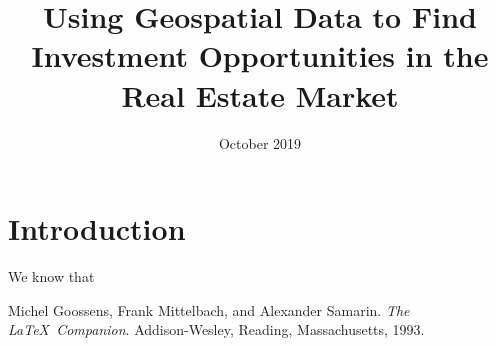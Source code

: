 \documentclass{article}
\title{Using Geospatial Data to Find Investment Opportunities in the Real Estate Market}
\author{}
\date{October 2019}
\begin{document}
\maketitle

\section{Introduction}
We know that 

\begin{thebibliography}{9}
Michel Goossens, Frank Mittelbach, and Alexander Samarin. 
\textit{The \LaTeX\ Companion}. 
Addison-Wesley, Reading, Massachusetts, 1993.

\end{thebibliography}
\end{document}
